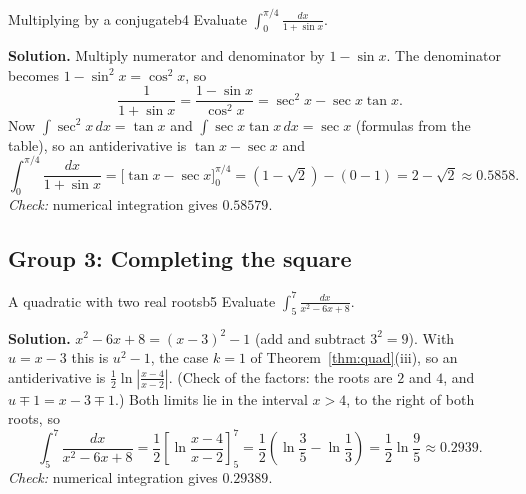 \documentclass[11pt]{article}
\begin{document}
\begin{exmp}{Multiplying by a conjugate}{b4}
Evaluate $\int_0^{\pi/4}\frac{dx}{1+\sin x}$.

\textbf{Solution.} Multiply numerator and denominator by $1-\sin x$. The denominator becomes $1-\sin^2x=\cos^2x$, so
\[\frac1{1+\sin x}=\frac{1-\sin x}{\cos^2x}=\sec^2x-\sec x\tan x .\]
Now $\int\sec^2x\,dx=\tan x$ and $\int\sec x\tan x\,dx=\sec x$ (formulas from the table), so an antiderivative is $\tan x-\sec x$ and
\[\int_0^{\pi/4}\frac{dx}{1+\sin x}=\Big[\tan x-\sec x\Big]_0^{\pi/4}=(1-\sqrt2)-(0-1)=2-\sqrt2\approx0.5858 .\]
\emph{Check:} numerical integration gives $0.58579$.
\end{exmp}

\subsection*{Group 3: Completing the square}

\begin{exmp}{A quadratic with two real roots}{b5}
Evaluate $\int_5^7\frac{dx}{x^2-6x+8}$.

\textbf{Solution.} $x^2-6x+8=(x-3)^2-1$ (add and subtract $3^2=9$). With $u=x-3$ this is $u^2-1$, the case $k=1$ of Theorem~\ref{thm:quad}(iii), so an antiderivative is $\frac12\ln\left\lvert\frac{x-4}{x-2}\right\rvert$. (Check of the factors: the roots are $2$ and $4$, and $u\mp1=x-3\mp1$.) Both limits lie in the interval $x>4$, to the right of both roots, so
\[\int_5^7\frac{dx}{x^2-6x+8}=\frac12\left[\ln\frac{x-4}{x-2}\right]_5^7=\frac12\left(\ln\frac35-\ln\frac13\right)=\frac12\ln\frac95\approx0.2939 .\]
\emph{Check:} numerical integration gives $0.29389$.
\end{exmp}
\end{document}

